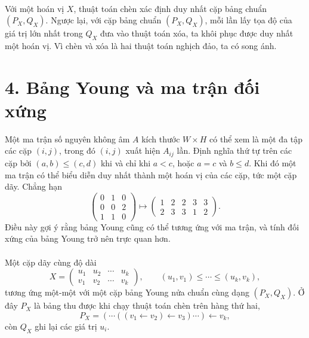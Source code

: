 \documentclass[11pt]{article}
\begin{document}
\paragraph{}
Với một hoán vị \(X\), thuật toán chèn xác định duy nhất cặp bảng chuẩn
\((P_X,Q_X)\). Ngược lại, với cặp bảng chuẩn \((P_X,Q_X)\), mỗi lần lấy tọa độ
của giá trị lớn nhất trong \(Q_X\) đưa vào thuật toán xóa, ta khôi phục được
duy nhất một hoán vị. Vì chèn và xóa là hai thuật toán nghịch đảo, ta có song
ánh.

\section*{4. Bảng Young và ma trận đối xứng}

Một ma trận số nguyên không âm \(A\) kích thước \(W\times H\) có thể xem là
một đa tập các cặp \((i,j)\), trong đó \((i,j)\) xuất hiện \(A_{ij}\) lần.
Định nghĩa thứ tự trên các cặp bởi \((a,b)\le(c,d)\) khi và chỉ khi
\(a<c\), hoặc \(a=c\) và \(b\le d\). Khi đó một ma trận có thể biểu diễn duy
nhất thành một hoán vị của các cặp, tức một cặp dãy. Chẳng hạn
\[
\begin{pmatrix}
0&1&0\\
0&0&2\\
1&1&0
\end{pmatrix}
\longmapsto
\begin{pmatrix}
1&2&2&3&3\\
2&3&3&1&2
\end{pmatrix}.
\]
Điều này gợi ý rằng bảng Young cũng có thể tương ứng với ma trận, và tính đối
xứng của bảng Young trở nên trực quan hơn.

\paragraph{}
Một cặp dãy cùng độ dài
\[
X=\begin{pmatrix}
u_1&u_2&\cdots&u_k\\
v_1&v_2&\cdots&v_k
\end{pmatrix},\qquad
(u_1,v_1)\le\cdots\le(u_k,v_k),
\]
tương ứng một-một với một cặp bảng Young nửa chuẩn cùng dạng \((P_X,Q_X)\).
Ở đây \(P_X\) là bảng thu được khi chạy thuật toán chèn trên hàng thứ hai,
\[
P_X=(\cdots((v_1\leftarrow v_2)\leftarrow v_3)\cdots)\leftarrow v_k,
\]
còn \(Q_X\) ghi lại các giá trị \(u_i\).
\end{document}
